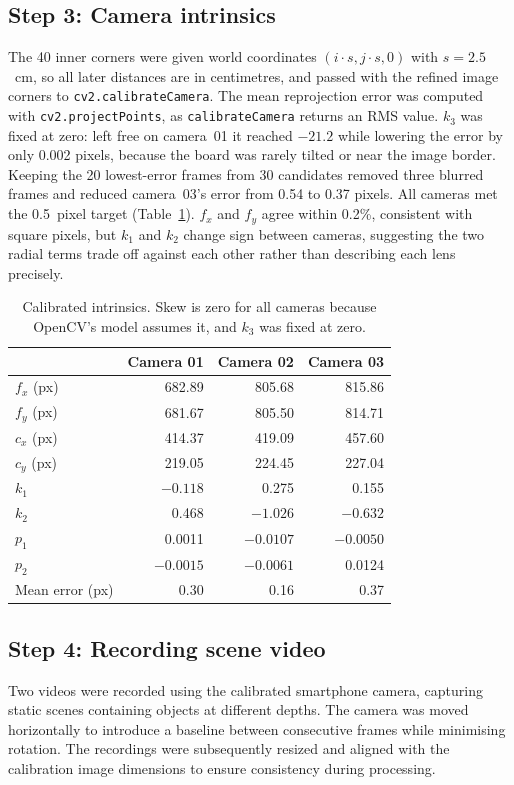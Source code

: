 \documentclass[conference]{IEEEtran}
\begin{document}
\subsection{Step 3: Camera intrinsics}
The 40 inner corners were given world coordinates $(i\cdot s, j\cdot s, 0)$ with $s=2.5$~cm, so all later distances are in centimetres, and passed with the refined image corners to \texttt{cv2.calibrateCamera}. The mean reprojection error was computed with \texttt{cv2.projectPoints}, as \texttt{calibrateCamera} returns an RMS value. $k_3$ was fixed at zero: left free on camera~01 it reached $-21.2$ while lowering the error by only 0.002 pixels, because the board was rarely tilted or near the image border. Keeping the 20 lowest-error frames from 30 candidates removed three blurred frames and reduced camera~03's error from 0.54 to 0.37 pixels. All cameras met the 0.5~pixel target (Table~\ref{tab:intrinsics}). $f_x$ and $f_y$ agree within 0.2\%, consistent with square pixels, but $k_1$ and $k_2$ change sign between cameras, suggesting the two radial terms trade off against each other rather than describing each lens precisely.

\begin{table}[htbp]
\caption{Calibrated intrinsics. Skew is zero for all cameras because OpenCV's model assumes it, and $k_3$ was fixed at zero.}
\label{tab:intrinsics}
\centering
\begin{tabular}{l r r r}
\hline
 & Camera 01 & Camera 02 & Camera 03 \\
\hline
$f_x$ (px) & 682.89 & 805.68 & 815.86 \\
$f_y$ (px) & 681.67 & 805.50 & 814.71 \\
$c_x$ (px) & 414.37 & 419.09 & 457.60 \\
$c_y$ (px) & 219.05 & 224.45 & 227.04 \\
$k_1$ & $-0.118$ & 0.275 & 0.155 \\
$k_2$ & 0.468 & $-1.026$ & $-0.632$ \\
$p_1$ & 0.0011 & $-0.0107$ & $-0.0050$ \\
$p_2$ & $-0.0015$ & $-0.0061$ & 0.0124 \\
Mean error (px) & 0.30 & 0.16 & 0.37 \\
\hline
\end{tabular}
\end{table}

\subsection{Step 4: Recording scene video}
Two videos were recorded using the calibrated smartphone camera, capturing static scenes containing objects at different depths. The camera was moved horizontally to introduce a baseline between consecutive frames while minimising rotation. The recordings were subsequently resized and aligned with the calibration image dimensions to ensure consistency during processing.
\end{document}
